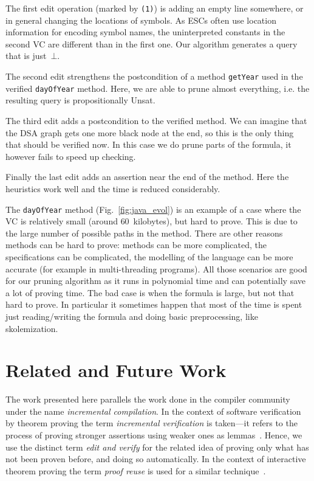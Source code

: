 \documentclass{llncs}
\def\lstinlinen{\lstinline[basicstyle=\normalsize\sffamily]}
\def\unsat{{\sc Unsat}}
\def\false{\bot}
\begin{document}
The first edit operation (marked by \lstinlinen|(1)|) is adding an empty
line somewhere, or in general changing the locations of symbols.
As ESCs often use location information for encoding symbol
names, the uninterpreted constants in the second VC are different
than in the first one. Our algorithm generates a query that is 
just~$\false$.

The second edit strengthens the postcondition
of a method \lstinlinen|getYear| used in the verified
\lstinlinen|dayOfYear| method. Here, we are able to prune 
almost everything, i.e. the resulting query is propositionally 
\unsat.

The third edit adds a postcondition to the verified method.
We can imagine that the DSA graph gets one more black node
at the end, so this is the only thing that should be verified
now. In this case we do prune parts of the formula, it however
fails to speed up checking.

Finally the last edit adds an assertion near the end of the method.
Here the heuristics work well and the time is reduced considerably.

The \lstinlinen|dayOfYear| method (Fig.~\ref{fig:java_evol}) is 
an example of a case where the VC is relatively small (around 
$60$~kilobytes), but hard to prove. This is due to the large 
number of possible paths in the method.
There are other reasons methods can be hard to prove: methods can be more complicated,
the specifications can be complicated, the modelling of the language can
be more accurate (for example in multi-threading programs). All those
scenarios are good for our pruning algorithm as it runs in polynomial
time and can potentially save a lot of proving time. The bad case is
when the formula is large, but not that hard to prove. In particular it
sometimes happen that most of the time is spent just reading/writing
the formula and doing basic preprocessing, like skolemization.


\section{Related and Future Work}
\label{sec:related}

The work presented here parallels the work done in the
compiler community under the name \emph{incremental compilation}.
In the context of software verification by theorem
proving the term \emph{incremental verification} is
taken---it refers to the process of proving stronger
assertions using weaker ones as lemmas~\cite{uribe2000cmc}. 
Hence, we use the distinct term \emph{edit and verify} 
for the related idea of proving only what has not been
proven before, and doing so automatically. In the context
of interactive theorem proving the term \emph{proof reuse}
is used for a similar technique~\cite{proof_reuse}.
\end{document}
